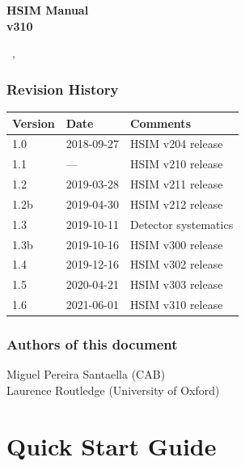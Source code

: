 \documentclass[12pt]{report}
\def\mydate{\leavevmode\hbox{\the\day~\monthname, \the\year}}
\begin{document}
\begin{titlepage}

\vspace*{4cm}
\begin{center}

{\selectfont
\Huge
\textbf{
HSIM Manual\\[0.5ex]
\Large
v310}
\vspace{2cm}

\large
\mydate
}
\end{center}
\vspace*{\fill}


\end{titlepage}

\tableofcontents

\vfill
\subsection*{Revision History}

\begin{table}[h]
\label{tab:revision}
\begin{tabular}{lll}
\hline
Version & Date & Comments \\
\hline
1.0 & 2018-09-27 & HSIM v204 release \\
1.1 & --- & HSIM v210 release \\
1.2 & 2019-03-28 & HSIM v211 release \\
1.2b & 2019-04-30 & HSIM v212 release \\
1.3 & 2019-10-11 & Detector systematics \\
1.3b & 2019-10-16 & HSIM v300 release \\
1.4 & 2019-12-16 & HSIM v302 release \\
1.5 & 2020-04-21 & HSIM v303 release \\
1.6 & 2021-06-01 & HSIM v310 release \\
\hline
\end{tabular}
\end{table}


\subsection*{Authors of this document}
Miguel Pereira Santaella (CAB) \\
Laurence Routledge (University of Oxford)

\clearpage

\chapter{Quick Start Guide}
\end{document}
